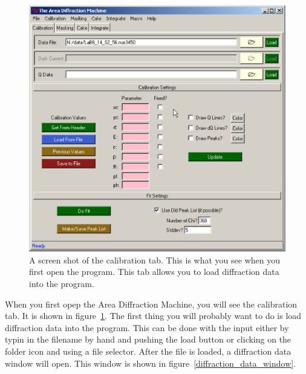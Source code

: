 \begin{figure}
    \centering
    \includegraphics[scale=.75]{figures/calibration_tab.eps}
    \caption{A screen shot of the calibration tab.
    This is what you see when you first open the program. 
    This tab allows you to load diffraction
    data into the program.} 
    \label{calibration_tab}
\end{figure}

When you first opep the Area Diffraction Machine, you
will see the calibration tab. It is shown in 
figure~\ref{calibration_tab}. The first thing you
will probably want to do is load diffraction data into
the program. This can be done with the  input
either by typin in the filename by hand and pushing the
load button or clicking on the folder icon and
using a file selector. After the file is loaded, a
diffraction data window will open. This window is 
shown in figure~\ref{diffraction_data_window}.

